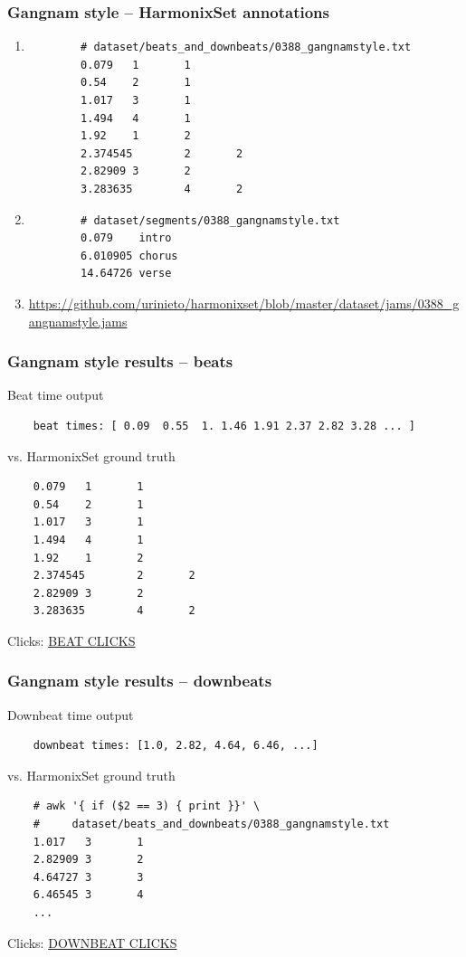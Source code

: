 \documentclass{beamer}
\begin{document}
\begin{frame}[fragile]
	\frametitle{Gangnam style -- HarmonixSet annotations}
	\begin{enumerate}
		\item
		\begin{verbatim}
		# dataset/beats_and_downbeats/0388_gangnamstyle.txt
		0.079   1       1
		0.54    2       1
		1.017   3       1
		1.494   4       1
		1.92    1       2
		2.374545        2       2
		2.82909 3       2
		3.283635        4       2
		\end{verbatim}
		\item
		\begin{verbatim}
		# dataset/segments/0388_gangnamstyle.txt
		0.079    intro
		6.010905 chorus
		14.64726 verse
		\end{verbatim}
		\item
		\href{https://github.com/urinieto/harmonixset/blob/master/dataset/jams/0388_gangnamstyle.jams}{https://github.com/urinieto/harmonixset/blob/master/dataset/jams/0388\_gangnamstyle.jams}
	\end{enumerate}

\end{frame}

\begin{frame}[fragile]
	\frametitle{Gangnam style results -- beats}
	Beat time output
	\begin{verbatim}
	beat times: [ 0.09  0.55  1. 1.46 1.91 2.37 2.82 3.28 ... ]
	\end{verbatim}
	vs. HarmonixSet ground truth
	\begin{verbatim}
	0.079   1       1
	0.54    2       1
	1.017   3       1
	1.494   4       1
	1.92    1       2
	2.374545        2       2
	2.82909 3       2
	3.283635        4       2
	\end{verbatim}
	Clicks: \href{run:./gangnam_beats.wav}{BEAT CLICKS}
\end{frame}

\begin{frame}[fragile]
	\frametitle{Gangnam style results -- downbeats}
	Downbeat time output
	\begin{verbatim}
	downbeat times: [1.0, 2.82, 4.64, 6.46, ...]
	\end{verbatim}
	vs. HarmonixSet ground truth
	\begin{verbatim}
	# awk '{ if ($2 == 3) { print }}' \
	#     dataset/beats_and_downbeats/0388_gangnamstyle.txt
	1.017   3       1
	2.82909 3       2
	4.64727 3       3
	6.46545 3       4
	...
	\end{verbatim}
	Clicks: \href{run:./gangnam_downbeats.wav}{DOWNBEAT CLICKS}
\end{frame}
\end{document}
